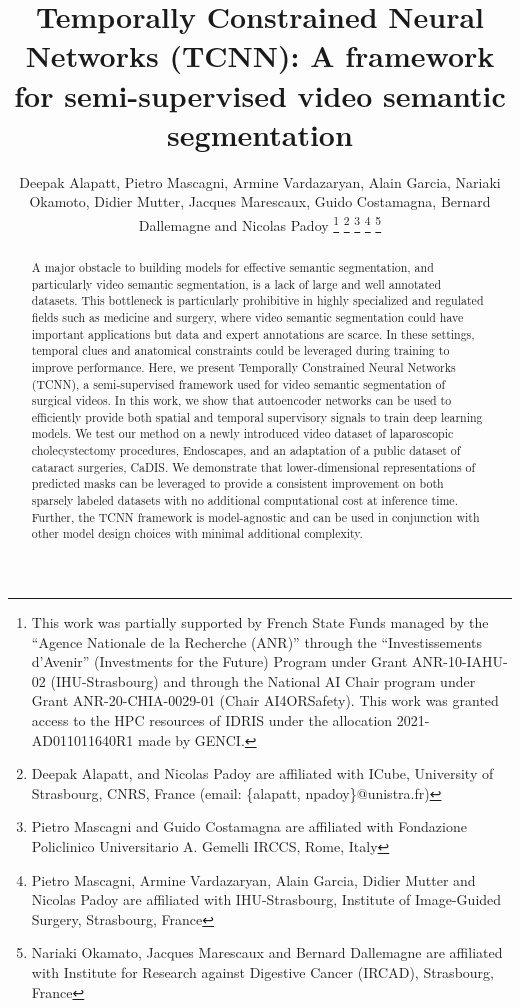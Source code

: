 \documentclass[twoside, print]{ieeecolor_arxiv}
\begin{document}
\title{Temporally Constrained Neural Networks (TCNN): A framework for semi-supervised video semantic segmentation}
\author{Deepak Alapatt, Pietro Mascagni, Armine Vardazaryan, Alain Garcia, Nariaki Okamoto, Didier Mutter, Jacques Marescaux, Guido Costamagna, Bernard Dallemagne and Nicolas Padoy
\thanks{
 This work was partially supported by French State Funds managed by the “Agence Nationale de la Recherche (ANR)” through the “Investissements d’Avenir” (Investments for the Future) Program under Grant ANR-10-IAHU-02 (IHU-Strasbourg) and through the National AI Chair program under Grant ANR-20-CHIA-0029-01 (Chair AI4ORSafety). This work was granted access to the HPC resources of IDRIS under the allocation 2021-AD011011640R1 made by GENCI.}
\thanks{Deepak Alapatt, and Nicolas Padoy are affiliated with ICube, University of Strasbourg, CNRS, France
(email: \{alapatt, npadoy\}@unistra.fr)
}
\thanks{Pietro Mascagni and Guido Costamagna are affiliated with Fondazione Policlinico Universitario A. Gemelli IRCCS, Rome, Italy}
\thanks{Pietro Mascagni, Armine Vardazaryan, Alain Garcia, Didier Mutter and Nicolas Padoy are affiliated with IHU-Strasbourg, Institute of Image-Guided Surgery, Strasbourg, France}
\thanks{Nariaki Okamato, Jacques Marescaux and Bernard Dallemagne are affiliated with Institute for Research against Digestive Cancer (IRCAD), Strasbourg, France}
}

\maketitle

\begin{abstract}
A major obstacle to building models for effective semantic segmentation, and particularly video semantic segmentation, is a lack of large and well annotated datasets. This bottleneck is particularly prohibitive in highly specialized and regulated fields such as medicine and surgery, where video semantic segmentation could have important applications but data and expert annotations are scarce. In these settings, temporal clues and anatomical constraints could be leveraged during training to improve performance. Here, we present Temporally Constrained Neural Networks (TCNN), a semi-supervised framework used for video semantic segmentation of surgical videos. In this work, we show that autoencoder networks can be used to efficiently provide both spatial and temporal supervisory signals to train deep learning models. We test our method on a newly introduced video dataset of laparoscopic cholecystectomy procedures, Endoscapes, and an adaptation of a public dataset of cataract surgeries, CaDIS. We demonstrate that lower-dimensional representations of predicted masks can be leveraged to provide a consistent improvement on both sparsely labeled datasets with no additional computational cost at inference time. Further, the TCNN framework is model-agnostic and can be used in conjunction with other model design choices with minimal additional complexity. 
\end{abstract}
\end{document}
